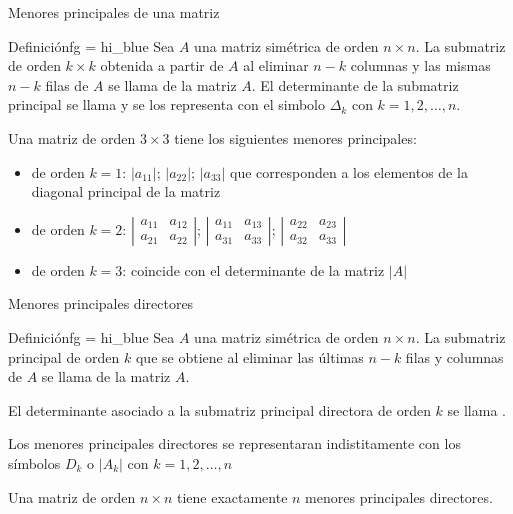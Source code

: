 \documentclass[10pt,aspectratio=169]{beamer}  %
\begin{document}
%
\begin{frame}{Menores principales de una matriz}

\begin{varblock}{Definición}{fg = hi_blue}
	Sea $A$ una matriz simétrica de orden $n \times n$. La submatriz de orden $k \times k$ obtenida a partir de $A$ al eliminar $n-k$ columnas
	y las mismas $n-k$ filas de $A$ se llama  de la matriz $A$.	
	El determinante de la submatriz principal se llama  y se los
	representa con el simbolo $\Delta_k$ con $k = 1, 2, \dots, n$.
\end{varblock}

Una matriz de orden $3 \times 3$ tiene los siguientes menores principales:

\begin{itemize}
	\item de orden $k = 1$: $| a_{11}|$; $| a_{22}|$; $| a_{33}|$ que corresponden a los elementos de la 
	diagonal principal de la matriz
	\item de orden $k = 2$:  $\left| \begin{array}{cc}
		a_{11} & a_{12} \\
		a_{21} & a_{22}
	\end{array}\right|$; $\left| \begin{array}{cc}
		a_{11} & a_{13} \\
		a_{31} & a_{33}
	\end{array}\right|$; $\left| \begin{array}{cc}
		a_{22} & a_{23} \\
		a_{32} & a_{33}
	\end{array}\right|$
	\item de orden $k = 3$: coincide con el determinante de la matriz $|A|$ 
\end{itemize}

\end{frame}

%
\begin{frame}{Menores principales directores}
	\begin{varblock}{Definición}{fg = hi_blue}
		Sea $A$ una matriz simétrica de orden $n \times n$. La submatriz principal de orden $k$ que se obtiene al 
		eliminar las últimas $n - k$ filas y columnas de $A$ se llama  
		de la matriz $A$. 
		
		El determinante asociado a la submatriz principal directora de orden $k$ se llama .
	\end{varblock}

	Los menores principales directores se representaran indistitamente con los símbolos $D_k$ o $|A_k|$ con $k = 1, 2, \dots, n$

	Una matriz de orden $n \times n$ tiene exactamente $n$ menores principales directores.
\end{frame}
\end{document}
